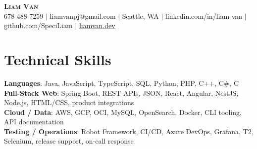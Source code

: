 \documentclass[letterpaper,11pt]{article}
\begin{document}

%
\begin{center}
    \textbf{\Huge \scshape Liam Van} \\ \vspace{1pt}
    \small 678-488-7259 $|$ \small {liamvanpj@gmail.com} $|$ Seattle, WA
 {{$|$ linkedin.com/in/liam-van} {$|$ github.com/SpeciLiam} {$|$ \href{https://liamvan.dev}{liamvan.dev}}}

\end{center}

\section{Technical Skills}
 \begin{itemize}[leftmargin=0.15in, label={}]
    \small{\item{
     \textbf{Languages}{: Java, JavaScript, TypeScript, SQL, Python, PHP, C++, C\#, C} \\
     \textbf{Full-Stack Web}{: Spring Boot, REST APIs, JSON, React, Angular, NestJS, Node.js, HTML/CSS, product integrations} \\
     \textbf{Cloud / Data}{: AWS, GCP, OCI, MySQL, OpenSearch, Docker, CLI tooling, API documentation} \\
     \textbf{Testing / Operations}{: Robot Framework, CI/CD, Azure DevOps, Grafana, T2, Selenium, release support, on-call response} \\
    }}
 \end{itemize}
%

\end{document}
